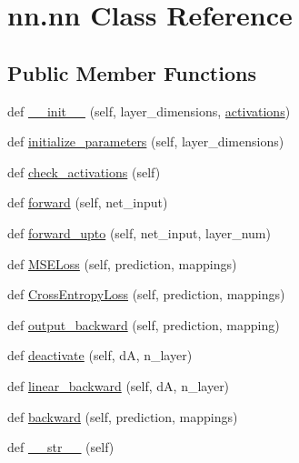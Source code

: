 \hypertarget{classnn_1_1nn}{}\section{nn.\+nn Class Reference}
\label{classnn_1_1nn}
\subsection*{Public Member Functions}
\begin{DoxyCompactItemize}
\item 
def \hyperlink{classnn_1_1nn_ad7304c7932970a07bf2869e97b79e0b5}{\+\_\+\+\_\+init\+\_\+\+\_\+} (self, layer\+\_\+dimensions, \hyperlink{classnn_1_1nn_acb7fb4cc0db120b007ef1ab1f82d7ba0}{activations})
\item 
def \hyperlink{classnn_1_1nn_a9821fed1369b4d709fe297fe9e07d97b}{initialize\+\_\+parameters} (self, layer\+\_\+dimensions)
\item 
def \hyperlink{classnn_1_1nn_a15ee3f3e18ebae83c904b3441ece897d}{check\+\_\+activations} (self)
\item 
def \hyperlink{classnn_1_1nn_ae07002745b03901814d92ac66fe87781}{forward} (self, net\+\_\+input)
\item 
def \hyperlink{classnn_1_1nn_ac3d2b61ed992dc615eacda8e75a61a2b}{forward\+\_\+upto} (self, net\+\_\+input, layer\+\_\+num)
\item 
def \hyperlink{classnn_1_1nn_ae74a0f21e8722ea82a0f94135a81a348}{M\+S\+E\+Loss} (self, prediction, mappings)
\item 
def \hyperlink{classnn_1_1nn_a822299322a0b513f8985e61096be45bc}{Cross\+Entropy\+Loss} (self, prediction, mappings)
\item 
def \hyperlink{classnn_1_1nn_afa7d1462872fae95fe71f27ed00bf7ae}{output\+\_\+backward} (self, prediction, mapping)
\item 
def \hyperlink{classnn_1_1nn_a475811849fd370a47eb0e3b7bc09b283}{deactivate} (self, dA, n\+\_\+layer)
\item 
def \hyperlink{classnn_1_1nn_a0863e90359fa30486c7161cd31c5b4e7}{linear\+\_\+backward} (self, dA, n\+\_\+layer)
\item 
def \hyperlink{classnn_1_1nn_a53a7beb698fe127ebb1f636fccbaa126}{backward} (self, prediction, mappings)
\item 
def \hyperlink{classnn_1_1nn_a1c967a0ae06ef2a7e8077cc9aa29aabc}{\+\_\+\+\_\+str\+\_\+\+\_\+} (self)
\end{DoxyCompactItemize}
